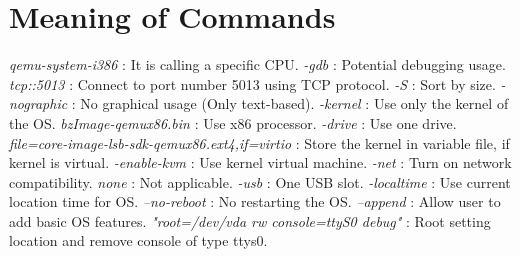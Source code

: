 \documentclass{article}
\begin{document}
\section*{Meaning of Commands}
\textit{qemu-system-i386} : It is calling a specific CPU.
\newline
\textit{-gdb} : Potential debugging usage.
\newline
\textit{tcp::5013} : Connect to port number 5013 using TCP protocol. 
\newline
\textit{-S} : Sort by size.
\newline
\textit{-nographic} : No graphical usage (Only text-based).
\newline
\textit{-kernel} : Use only the kernel of the OS.
\newline
\textit{bzImage-qemux86.bin} : Use x86 processor.
\newline
\textit{-drive} : Use one drive. 
\newline
\textit{file=core-image-lsb-sdk-qemux86.ext4,if=virtio} : Store the kernel in variable file, if kernel is virtual.
\newline
\textit{-enable-kvm} : Use kernel virtual machine.
\newline
\textit{-net} : Turn on network compatibility.
\newline
\textit{none} : Not applicable.
\newline
\textit{-usb} : One USB slot.
\newline
\textit{-localtime} : Use current location time for OS.
\newline
\textit{--no-reboot} : No restarting the OS.
\newline
\textit{--append} : Allow user to add basic OS features. 
\newline
\textit{"root=/dev/vda rw console=ttyS0 debug"} : Root setting location and remove console of type ttys0.
\newline

\end{document}
